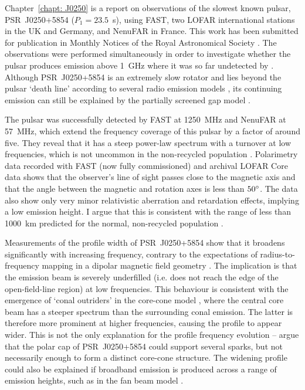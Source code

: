 Chapter~\ref{chapt: J0250} is a report on observations of the slowest known pulsar, PSR~J0250$+$5854 ($P_1 = 23.5$~s), using FAST, two LOFAR international stations in the UK and Germany, and NenuFAR in France. This work has been submitted for publication in Monthly Notices of the Royal Astronomical Society \citep{AWB+2021}. The observations were performed simultaneously in order to investigate whether the pulsar produces emission above 1~GHz where it was so far undetected by \citet{TBC+2018}. Although PSR~J0250+5854 is an extremely slow rotator and lies beyond the pulsar `death line' according to several radio emission models \citep{CRxx1993,ZHMx2000}, its continuing emission can still be explained by the partially screened gap model \citep{Sxxx2013,MBMA2020}.

The pulsar was successfully detected by FAST at 1250~MHz and NenuFAR at 57~MHz, which extend the frequency coverage of this pulsar by a factor of around five. They reveal that it has a steep power-law spectrum with a turnover at low frequencies, which is not uncommon in the non-recycled population \citep{Sxxx1973}. Polarimetry data recorded with FAST (now fully commissioned) and archival LOFAR Core data shows that the observer's line of sight passes close to the magnetic axis and that the angle between the magnetic and rotation axes is less than $50^\circ$. The data also show only very minor relativistic aberration and retardation effects, implying a low emission height. I argue that this is consistent with the range of less than 1000~km predicted for the normal, non-recycled population \citep{KJxx2007, JKxx2019}.

Measurements of the profile width of PSR~J0250+5854 show that it broadens significantly with increasing frequency, contrary to the expectations of radius-to-frequency mapping in a dipolar magnetic field geometry \citet{RSxx1975}. The implication is that the emission beam is severely underfilled (i.e. does not reach the edge of the open-field-line region) at low frequencies. This behaviour is consistent with the emergence of `conal outriders' in the core-cone model \citep{Rxxx1983a, Rxxx1983b, Rxxx1993}, where the central core beam has a steeper spectrum than the surrounding conal emission. The latter is therefore more prominent at higher frequencies, causing the profile to appear wider. This is not the only explanation for the profile frequency evolution -- \citet{MBMA2020} argue that the polar cap of PSR~J0250+5854 could support several sparks, but not necessarily enough to form a distinct core-cone structure. The widening profile could also be explained if broadband emission is produced across a range of emission heights, such as in the fan beam model \citep[e.g.][]{WPZ+2014}.

